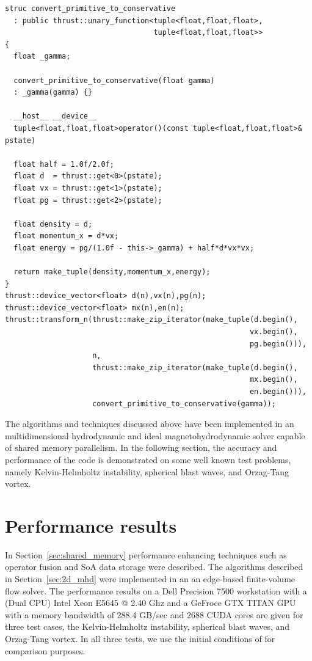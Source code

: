 \begin{lstlisting} 
struc convert_primitive_to_conservative
  : public thrust::unary_function<tuple<float,float,float>,
                                  tuple<float,float,float>>
{
  float _gamma;
  
  convert_primitive_to_conservative(float gamma)
  : _gamma(gamma) {}

  __host__ __device__
  tuple<float,float,float>operator()(const tuple<float,float,float>& pstate)

  float half = 1.0f/2.0f;
  float d  = thrust::get<0>(pstate);
  float vx = thrust::get<1>(pstate);
  float pg = thrust::get<2>(pstate);

  float density = d;
  float momentum_x = d*vx;
  float energy = pg/(1.0f - this->_gamma) + half*d*vx*vx;
  
  return make_tuple(density,momentum_x,energy);
}
thrust::device_vector<float> d(n),vx(n),pg(n); 
thrust::device_vector<float> mx(n),en(n); 
thrust::transform_n(thrust::make_zip_iterator(make_tuple(d.begin(),
                                                        vx.begin(),
                                                        pg.begin())),
                    n,
                    thrust::make_zip_iterator(make_tuple(d.begin(),
                                                        mx.begin(),
                                                        en.begin())),
                    convert_primitive_to_conservative(gamma));
\end{lstlisting} 

The algorithms and techniques discussed above have been implemented in an multidimensional hydrodynamic and ideal magnetohydrodynamic solver capable of shared memory parallelism.  In the following section, the accuracy and performance of the code is demonstrated on some well known test problems, namely Kelvin-Helmholtz instability, spherical blast waves, and Orzag-Tang vortex.  

\section[Performance results]{Performance results}
\label{sec:gpu_results}

In Section~\ref{sec:shared_memory} performance enhancing techniques such as operator fusion and SoA data storage were described.  The algorithms described in Section~\ref{sec:2d_mhd} were implemented in an an edge-based finite-volume flow solver.  The performance results on a Dell Precision 7500 workstation with a (Dual CPU) Intel Xeon E5645 @ 2.40 Ghz and a GeFroce GTX TITAN GPU with a memory bandwidth of 288.4 GB/sec and 2688 CUDA cores are given for three test cases, the Kelvin-Helmholtz instability, spherical blast waves, and Orzag-Tang vortex.  In all three tests, we use the initial conditions of \citep{url:athena} for comparison purposes.

